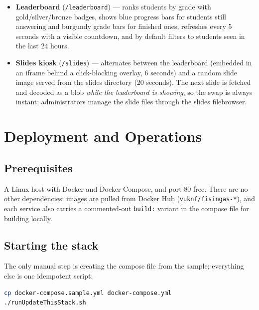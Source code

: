 \documentclass[11pt,a4paper]{article}
\newcommand{\code}[1]{\texttt{#1}}
\begin{document}
\begin{itemize}
  \item \textbf{Leaderboard} (\code{/leaderboard}) --- ranks students
        by grade with gold/silver/bronze badges, shows blue progress
        bars for students still answering and burgundy grade bars for
        finished ones, refreshes every 5 seconds with a visible
        countdown, and by default filters to students seen in the
        last 24 hours.
  \item \textbf{Slides kiosk} (\code{/slides}) --- alternates between
        the leaderboard (embedded in an iframe behind a
        click-blocking overlay, 6 seconds) and a random slide image
        served from the slides directory (20 seconds). The next slide
        is fetched and decoded as a blob \emph{while the leaderboard
        is showing}, so the swap is always instant; administrators
        manage the slide files through the slides filebrowser.
\end{itemize}

\section{Deployment and Operations}
\label{sec:usage}

\subsection{Prerequisites}

A Linux host with Docker and Docker Compose, and port 80 free. There
are no other dependencies: images are pulled from Docker Hub
(\code{vuknf/fisingas-*}), and each service also carries a
commented-out \code{build:} variant in the compose file for building
locally.

\subsection{Starting the stack}
\label{sec:deploy}

The only manual step is creating the compose file from the sample;
everything else is one idempotent script:

\begin{lstlisting}[language=bash]
cp docker-compose.sample.yml docker-compose.yml
./runUpdateThisStack.sh
\end{lstlisting}
\end{document}
